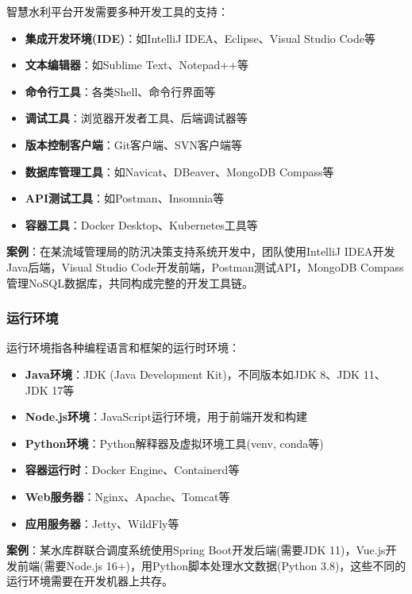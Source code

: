 智慧水利平台开发需要多种开发工具的支持：

\begin{itemize}
\tightlist
\item
  \textbf{集成开发环境(IDE)}：如IntelliJ IDEA、Eclipse、Visual Studio
  Code等
\item
  \textbf{文本编辑器}：如Sublime Text、Notepad++等
\item
  \textbf{命令行工具}：各类Shell、命令行界面等
\item
  \textbf{调试工具}：浏览器开发者工具、后端调试器等
\item
  \textbf{版本控制客户端}：Git客户端、SVN客户端等
\item
  \textbf{数据库管理工具}：如Navicat、DBeaver、MongoDB Compass等
\item
  \textbf{API测试工具}：如Postman、Insomnia等
\item
  \textbf{容器工具}：Docker Desktop、Kubernetes工具等
\end{itemize}

\textbf{案例}：在某流域管理局的防汛决策支持系统开发中，团队使用IntelliJ
IDEA开发Java后端，Visual Studio Code开发前端，Postman测试API，MongoDB
Compass管理NoSQL数据库，共同构成完整的开发工具链。

\subsubsection{运行环境}\label{ux8fd0ux884cux73afux5883}

运行环境指各种编程语言和框架的运行时环境：

\begin{itemize}
\tightlist
\item
  \textbf{Java环境}：JDK (Java Development Kit)，不同版本如JDK 8、JDK
  11、JDK 17等
\item
  \textbf{Node.js环境}：JavaScript运行环境，用于前端开发和构建
\item
  \textbf{Python环境}：Python解释器及虚拟环境工具(venv, conda等)
\item
  \textbf{容器运行时}：Docker Engine、Containerd等
\item
  \textbf{Web服务器}：Nginx、Apache、Tomcat等
\item
  \textbf{应用服务器}：Jetty、WildFly等
\end{itemize}

\textbf{案例}：某水库群联合调度系统使用Spring Boot开发后端(需要JDK
11)，Vue.js开发前端(需要Node.js 16+)，用Python脚本处理水文数据(Python
3.8)，这些不同的运行环境需要在开发机器上共存。

